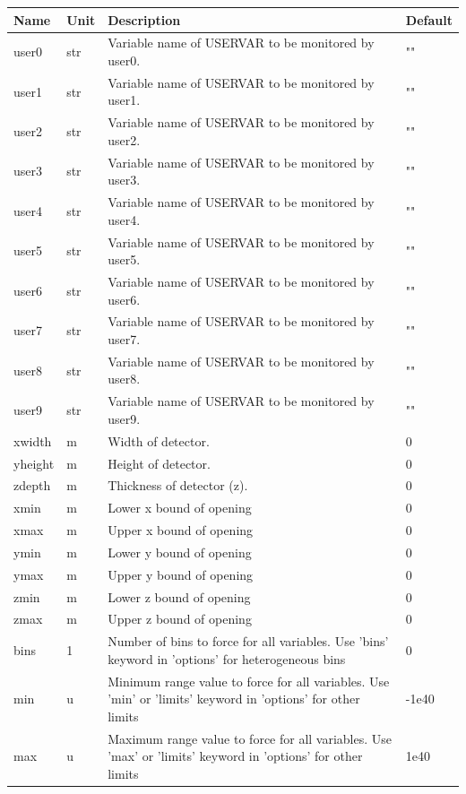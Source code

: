 \begin{longtable}{p{}p{}p{}p{}}
\toprule
\textbf{Name} & \textbf{Unit} & \textbf{Description} & \textbf{Default} \\
\midrule
\endhead
user0 & str & Variable name of USERVAR to be monitored by user0. & "" \\
user1 & str & Variable name of USERVAR to be monitored by user1. & "" \\
user2 & str & Variable name of USERVAR to be monitored by user2. & "" \\
user3 & str & Variable name of USERVAR to be monitored by user3. & "" \\
user4 & str & Variable name of USERVAR to be monitored by user4. & "" \\
user5 & str & Variable name of USERVAR to be monitored by user5. & "" \\
user6 & str & Variable name of USERVAR to be monitored by user6. & "" \\
user7 & str & Variable name of USERVAR to be monitored by user7. & "" \\
user8 & str & Variable name of USERVAR to be monitored by user8. & "" \\
user9 & str & Variable name of USERVAR to be monitored by user9. & "" \\
xwidth & m & Width of detector. & 0 \\
yheight & m & Height of detector. & 0 \\
zdepth & m & Thickness of detector (z). & 0 \\
xmin & m & Lower x bound of opening & 0 \\
xmax & m & Upper x bound of opening & 0 \\
ymin & m & Lower y bound of opening & 0 \\
ymax & m & Upper y bound of opening & 0 \\
zmin & m & Lower z bound of opening & 0 \\
zmax & m & Upper z bound of opening & 0 \\
bins & 1 & Number of bins to force for all variables. Use 'bins' keyword in 'options' for heterogeneous bins & 0 \\
min & u & Minimum range value to force for all variables. Use 'min' or 'limits' keyword in 'options' for other limits & -1e40 \\
max & u & Maximum range value to force for all variables. Use 'max' or 'limits' keyword in 'options' for other limits & 1e40 \\

\end{longtable}
